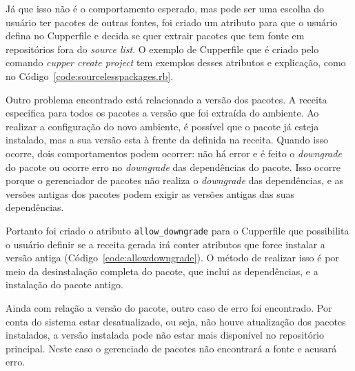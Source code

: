 Já que isso não é o comportamento esperado, mas pode ser uma escolha do usuário
ter pacotes de outras fontes, foi criado um atributo para que o usuário defina no
Cupperfile e decida se quer extrair pacotes que tem fonte em repositórios
fora do \textit{source list}. O exemplo de Cupperfile que é criado pelo comando
\textit{cupper create project} tem exemplos desses atributos e explicação, como
no Código~\ref{code:sourcelesspackages.rb}.

\noindent\begin{minipage}{\textwidth}
  \lstset{style=shell}
  
\end{minipage}\hfill

Outro problema encontrado está relacionado a versão dos pacotes.
A receita especifica para todos os pacotes a versão que foi extraída do ambiente.
Ao realizar a configuração do novo ambiente, é possível que o pacote já esteja instalado,
mas a sua versão esta à frente da definida na receita. Quando isso ocorre, dois comportamentos
podem ocorrer: não há error e é feito o \textit{downgrade} do pacote ou ocorre erro no \textit{downgrade} das
dependências do pacote. Isso ocorre porque o gerenciador de pacotes não realiza o \textit{downgrade}
das dependências, e as versões antigas dos pacotes podem exigir as versões antigas das suas
dependências.

Portanto foi criado o atributo \texttt{allow\_downgrade} para o Cupperfile que possibilita
o usuário definir se a receita gerada irá conter atributos que force instalar
a versão antiga (Código~\ref{code:allowdowngrade}). O método de realizar isso
é por meio da desinstalação completa do pacote, que inclui as dependências,
e a instalação do pacote antigo.

\noindent\begin{minipage}{\textwidth}
  \lstset{style=shell}
  
\end{minipage}\hfill

Ainda com relação a versão do pacote, outro caso de erro foi encontrado.
Por conta do sistema estar desatualizado, ou seja, não houve atualização dos pacotes
instalados, a versão instalada pode não estar mais disponível no repositório principal.
Neste caso o gerenciado de pacotes não encontrará a fonte e acusará erro.

